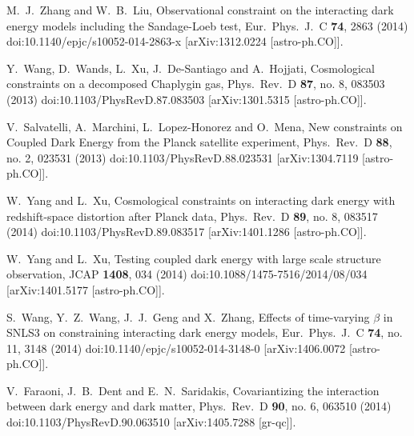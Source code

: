 \documentclass[aps,prd,nofootinbib,amsmath,amssymb,superscriptaddress,twocolumn,10pt]{revtex4}%
\begin{document}
\begin{thebibliography}{99}
  M.~J.~Zhang and W.~B.~Liu,
  Observational constraint on the interacting dark energy models including the Sandage-Loeb test,
  Eur.\ Phys.\ J.\ C {\bf 74}, 2863 (2014)
  doi:10.1140/epjc/s10052-014-2863-x
  [arXiv:1312.0224 [astro-ph.CO]].

  Y.~Wang, D.~Wands, L.~Xu, J.~De-Santiago and A.~Hojjati,
  Cosmological constraints on a decomposed Chaplygin gas,
  Phys.\ Rev.\ D {\bf 87}, no. 8, 083503 (2013)
  doi:10.1103/PhysRevD.87.083503
  [arXiv:1301.5315 [astro-ph.CO]].

  V.~Salvatelli, A.~Marchini, L.~Lopez-Honorez and O.~Mena,
  New constraints on Coupled Dark Energy from the Planck satellite experiment,
  Phys.\ Rev.\ D {\bf 88}, no. 2, 023531 (2013)
  doi:10.1103/PhysRevD.88.023531
  [arXiv:1304.7119 [astro-ph.CO]].

  W.~Yang and L.~Xu,
  Cosmological constraints on interacting dark energy with redshift-space distortion after Planck data,
  Phys.\ Rev.\ D {\bf 89}, no. 8, 083517 (2014)
  doi:10.1103/PhysRevD.89.083517
  [arXiv:1401.1286 [astro-ph.CO]].

  W.~Yang and L.~Xu,
  Testing coupled dark energy with large scale structure observation,
  JCAP {\bf 1408}, 034 (2014)
  doi:10.1088/1475-7516/2014/08/034
  [arXiv:1401.5177 [astro-ph.CO]].

  S.~Wang, Y.~Z.~Wang, J.~J.~Geng and X.~Zhang,
  Effects of time-varying $\beta$ in SNLS3 on constraining interacting dark energy models,
  Eur.\ Phys.\ J.\ C {\bf 74}, no. 11, 3148 (2014)
  doi:10.1140/epjc/s10052-014-3148-0
  [arXiv:1406.0072 [astro-ph.CO]].

  V.~Faraoni, J.~B.~Dent and E.~N.~Saridakis,
  Covariantizing the interaction between dark energy and dark matter,
  Phys.\ Rev.\ D {\bf 90}, no. 6, 063510 (2014)
  doi:10.1103/PhysRevD.90.063510
  [arXiv:1405.7288 [gr-qc]].


\end{thebibliography}
\end{document}
